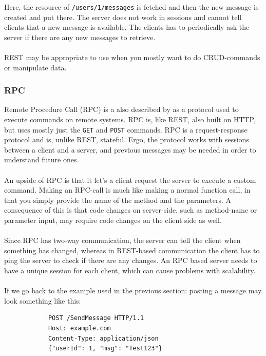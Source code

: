 \documentclass{cslthse-msc}
\begin{document}
    Here, the resource of \texttt{/users/1/messages} is fetched and then the
    new message is created and put there. The server does not work in
    sessions and cannot tell clients that a new message is available. The
    clients has to periodically ask the server if there are any new messages
    to retrieve.
    \\ \\
    REST may be appropriate to use when you mostly want to do CRUD-commands
    or manipulate data.

    \subsubsection{RPC}

    Remote Procedure Call (RPC) is a also described by \citet{rest1, rest2} as a protocol used to execute commands on remote systems. RPC is, like REST, also
    built on HTTP, but uses mostly just the \texttt{GET} and \texttt{POST} commands. RPC is a request-response protocol and is, unlike
    REST, stateful. Ergo, the protocol works with sessions between a client and a server, and previous messages may
    be needed in order to understand future ones.
    \\ \\
    An upside of RPC is that it let's a client request the server to execute
    a custom command. Making an RPC-call is much like making a normal
    function call, in that you simply provide the name of the method and the
    parameters. A consequence of this is that code changes on server-side,
    such as method-name or parameter input, may require code changes on the
    client side as well.
    \\ \\
    Since RPC has two-way communication, the server can tell the client when
    something has changed, whereas in REST-based communication the client
    has to ping the server to check if there are any changes. An RPC based
    server needs to have a unique session for each client, which can cause
    problems with scalability.
    \\ \\
    If we go back to the example used in the previous section: posting a message
    may look something like this:

    \begin{center}
        \lstset{%
        caption=An example of how an API call can look using RPC,
        basicstyle=\ttfamily\footnotesize\bfseries,
        frame=tb
        }
        \begin{lstlisting}
            POST /SendMessage HTTP/1.1
            Host: example.com
            Content-Type: application/json
            {"userId": 1, "msg": "Test123"}
        \end{lstlisting}
    \end{center}
\end{document}
